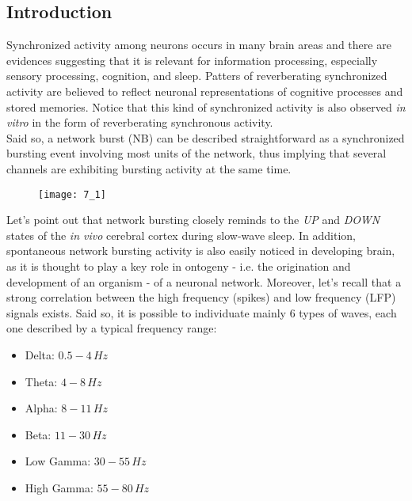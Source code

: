 \subsection{Introduction}
Synchronized activity among neurons occurs in many brain areas and there are evidences
suggesting that it is relevant for information processing, especially sensory
processing, cognition, and sleep. Patters of reverberating synchronized activity are
believed to reflect neuronal representations of cognitive processes and stored
memories. Notice that this kind of synchronized activity is also observed
\textit{in vitro} in the form of reverberating synchronous activity.\\
Said so, a network burst (NB) can be described straightforward as a synchronized
bursting event involving most units of the network, thus implying that several
channels are exhibiting bursting activity at the same time.
\begin{figure}[H]
    \texttt{[image: 7\_1]}
    \centering
\end{figure}
Let's point out that network bursting closely reminds to the \textit{UP} and
\textit{DOWN} states of the \textit{in vivo} cerebral cortex during slow-wave
sleep. In addition, spontaneous network bursting activity is also easily
noticed in developing brain, as it is thought to play a key role in
ontogeny - i.e. the origination and development of an organism -
of a neuronal network.
Moreover, let's recall that a strong correlation between the high frequency (spikes)
and low frequency (LFP) signals exists. Said so, it is possible to individuate mainly
6 types of waves, each one described by a typical frequency range:
\begin{itemize}
    \item Delta: \(0.5-4\,Hz\)
    \item Theta: \(4-8\,Hz\)
    \item Alpha: \(8-11\,Hz\)
    \item Beta: \(11-30\,Hz\)
    \item Low Gamma: \(30-55\,Hz\)
    \item High Gamma: \(55-80\,Hz\)
\end{itemize}

